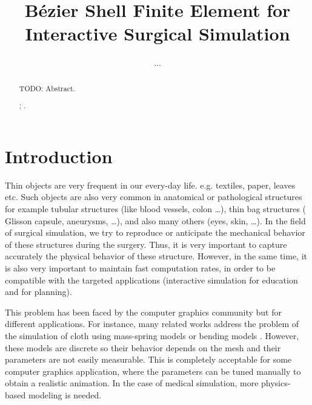 \documentclass{egpubl}
\title[B\'ezier Shell FE]%
      {B\'ezier Shell Finite Element for Interactive Surgical Simulation}
\author[...]
       {...} %
\begin{document}

\maketitle

\begin{abstract} %
    TODO: Abstract.

\begin{classification} %
    ;
    .
\end{classification}

\end{abstract}






\section{Introduction} %

Thin objects are very frequent in our every-day life. %
e.g. textiles, paper, leaves etc. 
Such objects are also very common in anatomical or pathological structures for example tubular structures (like blood vessels, colon \ldots), thin bag structures (%
Glisson capsule, aneurysms,  \ldots), and also many others (eyes, skin, \ldots). 
In the field of surgical simulation, we try to reproduce or anticipate the mechanical behavior of these structures during the surgery.
Thus, it is very important to capture accurately the physical behavior of these structure.
However, in the same time, it is also very important to maintain fast computation rates, in order to be compatible with the targeted applications (interactive simulation for education and for planning).

This problem has been faced by the computer graphics community but for different applications.
For instance, many related works address the problem of the simulation of cloth using mass-spring models \cite{Volino2009} or bending models \cite{Grinspun2003}. %
However, these models are discrete so their behavior depends on the mesh and their parameters are not easily measurable.
This is completely acceptable for some computer graphics application, where the parameters can be tuned manually to obtain a realistic animation.
In the case of medical simulation, more physics-based modeling is needed.
\end{document}
